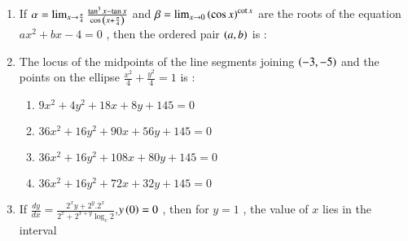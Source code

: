 \documentclass[journal]{IEEEtran}
\begin{document}
\begin{enumerate}[start=1]
\begin{enumerate}
\end{enumerate}
\item %
If $\alpha= \lim_{x \to \frac{\pi}{4}} \frac{\tan^3{x}-\tan{x}}{\cos{\ensuremath{\left(x+\frac{\pi}{4}\right)}} }$ and $\beta = \lim_{x \to 0} \left(\cos{x}\right)^{\cot{x}}$ are the roots of the equation $ax^2+bx-4=0$ , then the ordered pair $\left(a,b\right)$ is :
\begin{enumerate}
\end{enumerate}
\begin{enumerate}
\end{enumerate}
\item %
The locus of the midpoints of the line segments joining $\left(-3,-5\right)$ and the points on the ellipse $\frac{x^2}{4}+\frac{y^2}{4}=1$ is :
\begin{enumerate}
\item $9x^2 + 4y^2 + 18x + 8y + 145=0$
\item $36x^2 + 16y^2 +90x +56y +145=0$
\item $36x^2 + 16y^2 +108x +80y +145=0$
\item $36x^2 + 16y^2 +72x +32y +145=0$
\end{enumerate}
\item %
If $\frac{dy}{dx}= \frac{2^xy+2^y.2^x}{2^x+2^{x+y}\log_e 2}$,$y\left(0\right) = 0$ , then for $y=1$ , the value of $x$ lies in the interval 
\begin{enumerate}
\begin{multicols}{2}
\item $\brak{1,2}$
\item $(\frac{1}{2},1]$
\end{multicols}
\end{enumerate}
\begin{enumerate}
\begin{multicols}{2}
\item $\brak{2,3}$
\item $(0,\frac{1}{2}]$
\end{multicols}
\end{enumerate}


\end{enumerate}
\end{document}
